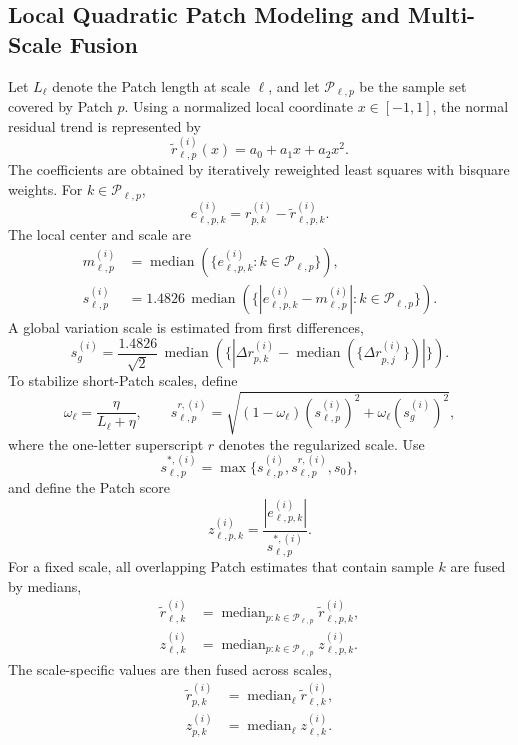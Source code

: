 \documentclass[journal]{IEEEtran}
\newcommand{\med}{\operatorname{median}}
\begin{document}
\subsection{Local Quadratic Patch Modeling and Multi-Scale Fusion}
Let $L_\ell$ denote the Patch length at scale $\ell$, and let $\mathcal P_{\ell,p}$ be the sample set covered by Patch $p$. Using a normalized local coordinate $x\in[-1,1]$, the normal residual trend is represented by
\begin{equation}
\tilde r_{\ell,p}^{(i)}(x)=a_0+a_1x+a_2x^2.
\end{equation}
The coefficients are obtained by iteratively reweighted least squares with bisquare weights. For $k\in\mathcal P_{\ell,p}$,
\begin{equation}
e_{\ell,p,k}^{(i)}=r_{p,k}^{(i)}-\tilde r_{\ell,p,k}^{(i)}.
\end{equation}
The local center and scale are
\begin{align}
m_{\ell,p}^{(i)}&=\med\left(\{e_{\ell,p,k}^{(i)}:k\in\mathcal P_{\ell,p}\}\right),\\
s_{\ell,p}^{(i)}&=1.4826\,\med\left(\{|e_{\ell,p,k}^{(i)}-m_{\ell,p}^{(i)}|:k\in\mathcal P_{\ell,p}\}\right).
\end{align}
A global variation scale is estimated from first differences,
\begin{equation}
s_g^{(i)}=\frac{1.4826}{\sqrt 2}\,
\med\left(\{|\Delta r_{p,k}^{(i)}-\med(\{\Delta r_{p,j}^{(i)}\})|\}\right).
\end{equation}
To stabilize short-Patch scales, define
\begin{equation}
\omega_\ell=\frac{\eta}{L_\ell+\eta},\qquad
s_{\ell,p}^{r,(i)}=
\sqrt{(1-\omega_\ell)(s_{\ell,p}^{(i)})^2+\omega_\ell(s_g^{(i)})^2},
\end{equation}
where the one-letter superscript $r$ denotes the regularized scale. Use
\begin{equation}
s_{\ell,p}^{*,(i)}=\max\{s_{\ell,p}^{(i)},s_{\ell,p}^{r,(i)},s_0\},
\end{equation}
and define the Patch score
\begin{equation}
z_{\ell,p,k}^{(i)}=\frac{|e_{\ell,p,k}^{(i)}|}{s_{\ell,p}^{*,(i)}}.
\end{equation}
For a fixed scale, all overlapping Patch estimates that contain sample $k$ are fused by medians,
\begin{align}
\tilde r_{\ell,k}^{(i)}&=\med_{p:k\in\mathcal P_{\ell,p}}\tilde r_{\ell,p,k}^{(i)},\\
z_{\ell,k}^{(i)}&=\med_{p:k\in\mathcal P_{\ell,p}}z_{\ell,p,k}^{(i)}.
\end{align}
The scale-specific values are then fused across scales,
\begin{align}
\tilde r_{p,k}^{(i)}&=\med_{\ell}\tilde r_{\ell,k}^{(i)},\\
z_{p,k}^{(i)}&=\med_{\ell}z_{\ell,k}^{(i)}.
\end{align}
\end{document}
